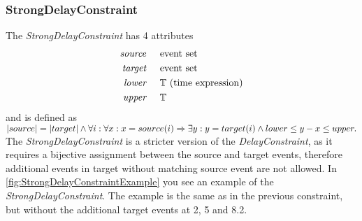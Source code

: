 	\subsubsection{StrongDelayConstraint}
		The \emph{StrongDelayConstraint} has 4 attributes
		\begin{align*}
			\emph{source} & \hspace{.5cm}\text{event set}\\
			\emph{target} & \hspace{.5cm}\text{event set}\\
			\emph{lower}  & \hspace{.5cm}\text{$\mathbb{T}$ (time expression)}\\
			\emph{upper}  & \hspace{.5cm}\text{$\mathbb{T}$}
		\end{align*}
		and is defined as\\[10pt]
		\begin{math}
			|source| = |target| \land\\
			\forall i: \forall x: x=source(i) \Rightarrow \exists y: y=target(i)\land lower\leq y-x\leq upper.
		\end{math}\\[10pt]
		The \emph{StrongDelayConstraint} is a stricter version of the \emph{DelayConstraint}, as it requires a bijective assignment between the source and target events, therefore additional events in target without matching source event are not allowed. In \ref{fig:StrongDelayConstraintExample} you see an example of the \emph{StrongDelayConstraint}. The example is the same as in the previous constraint, but without the additional target events at 2, 5 and 8.2.
